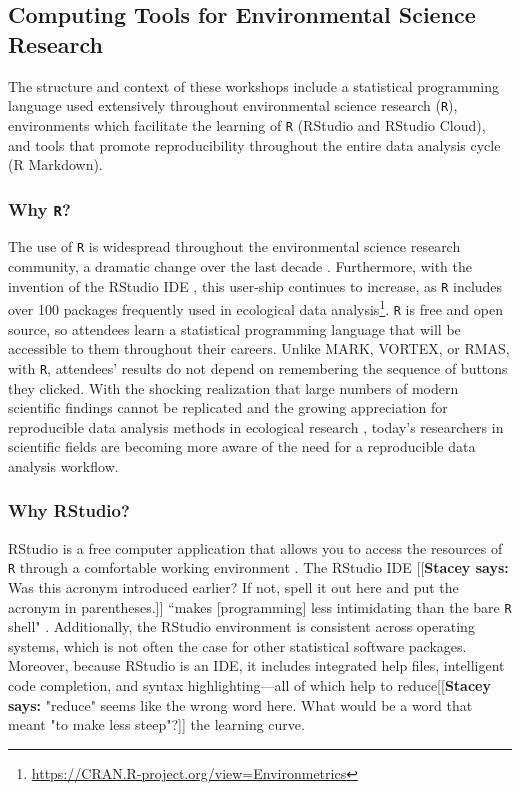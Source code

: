 \documentclass[12pt]{article}
\newcommand{\stacey}[1]{{\color{purple}[[\textbf{Stacey says: }#1]]}}
\begin{document}
\subsection{Computing Tools for Environmental Science Research}  

\quad The structure and context of these workshops include a statistical
programming language used extensively throughout environmental science research
(\texttt{R}), environments which facilitate the learning of \texttt{R}
(RStudio and RStudio Cloud), and tools that promote reproducibility throughout
the entire data analysis cycle (R Markdown).

\subsubsection{Why \texttt{R}?} 

\quad The use of \texttt{R} is widespread throughout the environmental science
research community, a dramatic change over the last decade \citep{Rpopular}. 
Furthermore, with the invention of the RStudio IDE \citep{rstudio}, this
user-ship continues to increase, as \texttt{R} includes over 100 packages
frequently used in ecological data analysis\footnote{\href{https://CRAN.R-project.org/view=Environmetrics}{https://CRAN.R-project.org/view=Environmetrics}}. \texttt{R} is free and open source, so
attendees learn a statistical programming language that will be accessible to
them throughout their careers. Unlike MARK, VORTEX, or RMAS, with \texttt{R}, 
attendees' results do not depend on remembering the sequence of buttons they
clicked. With the shocking realization that large numbers of modern scientific
findings cannot be replicated \citep{economist, johnson} and the growing
appreciation for reproducible data analysis methods in ecological research
\citep{reproducibilty-comment, repeatability, pva, reproducibility_ecology},
today's researchers in scientific fields are becoming more aware of the need for
a reproducible data analysis workflow. 

\subsubsection{Why RStudio?}

\quad RStudio is a free computer application that allows you to access the 
resources of \texttt{R} through a comfortable working
environment \citep{rstudio}. The RStudio IDE
\stacey{Was this acronym introduced earlier? If not, spell it out here and put the acronym in parentheses.}
``makes [programming] less
intimidating than the bare \texttt{R} shell" \citep[p.\ 59]{mine}. Additionally,
the RStudio environment is consistent across operating systems, which is not often the
case for other statistical software packages. Moreover, because RStudio is an
IDE, it includes integrated help files, intelligent code completion, and syntax 
highlighting---all of which help to reduce\stacey{"reduce" seems like the wrong word here.
What would be a word that meant "to make less steep"?} the learning curve. 
\end{document}
